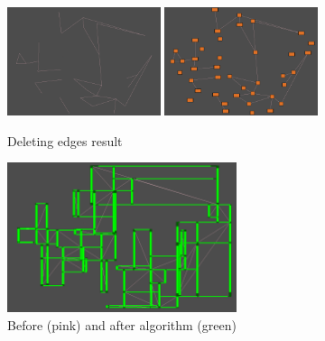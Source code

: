\documentclass{article}
\begin{document}
\begin{figure}
\centering
\includegraphics[width = 0.4\textwidth]{deleted edges no rooms}
\includegraphics[width = 0.4\textwidth]{deleted edges}
\caption{Deleting edges result}
\label{deleting edges result}
\end{figure}

\begin{figure}
\centering
\includegraphics[width = 0.6\textwidth]{coridoors and edges}
\caption{Before (pink) and after algorithm (green)}
\label{ba coridoors and edges}
\end{figure}

\newpage
\printbibliography
\end{document}
